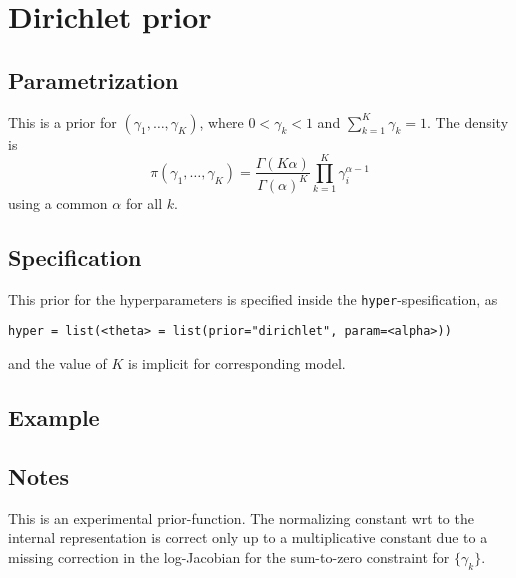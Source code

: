 \documentclass[a4paper,11pt]{article}
\begin{document}
\section*{Dirichlet prior}

\subsection*{Parametrization}
This is a prior for $(\gamma_1, \ldots, \gamma_K)$, where
$0<\gamma_k<1$ and $\sum_{k=1}^{K} \gamma_k = 1$. The density is
\begin{displaymath}
    \pi(\gamma_1, \ldots, \gamma_K) = \frac{\Gamma(K\alpha)}{\Gamma(\alpha)^{K}}
    \prod_{k=1}^{K} \gamma_i^{\alpha-1}
\end{displaymath}
using a common $\alpha$ for all $k$.

\subsection*{Specification}

This prior for the hyperparameters is specified inside the
\texttt{hyper}-spesification, as
\begin{center}
    \texttt{hyper = list(<theta> =
        list(prior="dirichlet", param=<alpha>))}
\end{center}
and the value of $K$ is implicit for corresponding model.



\subsection*{Example}

\subsection*{Notes}

This is an experimental prior-function. The normalizing constant wrt
to the internal representation is correct only up to a multiplicative
constant due to a missing correction in the log-Jacobian for the
sum-to-zero constraint for $\{\gamma_k\}$.
\end{document}
